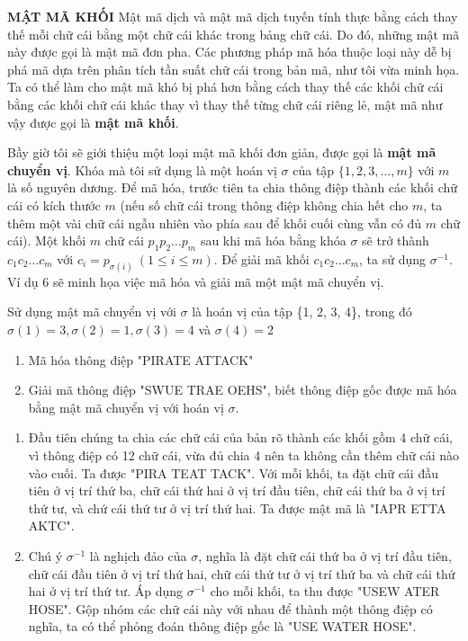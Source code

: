 \noindent \textcolor{Mycolor}{\textbf{MẬT MÃ KHỐI}} Mật mã dịch và mật mã dịch tuyến tính thực bằng cách thay thế mỗi chữ cái bằng một chữ cái khác trong bảng chữ cái. Do đó, những mật mã này được gọi là mật mã đơn pha. Các phương pháp mã hóa thuộc loại này dễ bị phá mã dựa trên phân tích tần suất chữ cái trong bản mã, như tôi vừa minh họa. Ta có thể làm cho mật mã khó bị phá hơn bằng cách thay thế các khối chữ cái bằng các khối chữ cái khác thay vì thay thế từng chữ cái riêng lẻ, mật mã như vậy được gọi là \textbf{mật mã khối}.

Bầy giờ tôi sẽ giới thiệu một loại mật mã khối đơn giản, được gọi là \textbf{mật mã chuyển vị}. Khóa mà tôi sử dụng là một hoán vị $\sigma$ của tập $\{1,2,3,\ldots,m\}$ với $m$ là số nguyên dương. Để mã hóa, trước tiên ta chia thông điệp thành các khối chữ cái có kích thước $m$ (nếu số chữ cái trong thông điệp không chia hết cho $m$, ta thêm một vài chữ cái ngẫu nhiên vào phía sau để khối cuối cùng vẫn có đủ $m$ chữ cái). Một khối $m$ chữ cái $p_1p_2\ldots p_m$ sau khi mã hóa bằng khóa $\sigma$ sẽ trở thành $c_1c_2\ldots c_m$ với $c_i = p_{\sigma(i)}\ ( 1\leq i \leq m)$. Để giải mã khối $c_1c_2\ldots c_m$, ta sử dụng $\sigma^{-1}$. Ví dụ 6 sẽ minh họa việc mã hóa và giải mã một mật mã chuyển vị.

\begin{example}
    Sử dụng mật mã chuyển vị với $\sigma$ là hoán vị của tập \{1, 2, 3, 4\}, trong đó $\sigma (1) = 3, \sigma (2) = 1, \sigma (3) = 4$ và $\sigma (4) = 2$
    \begin{enumerate}[label=\alph*)]
        \item Mã hóa thông điệp "PIRATE ATTACK"
        \item Giải mã thông điệp "SWUE TRAE OEHS", biết thông điệp gốc được mã hóa bằng mật mã chuyển vị với hoán vị $\sigma$.
    \end{enumerate}
\end{example}
\begin{solution}
    \begin{enumerate}[label=\alph*)]
        \item Đầu tiên chúng ta chia các chữ cái của bản rõ thành các khối gồm 4 chữ cái, vì thông điệp có 12 chữ cái, vừa đủ chia 4 nên ta không cần thêm chữ cái nào vào cuối.
              Ta được "PIRA TEAT TACK". Với mỗi khối, ta đặt chữ cái đầu tiên ở vị trí thứ ba, chữ cái thứ hai ở vị trí đầu tiên, chữ cái thứ ba ở vị trí thứ tư, và chứ cái thứ tư ở vị trí thứ hai.
              Ta được mật mã là "IAPR ETTA AKTC".

        \item Chú ý $\sigma^{-1}$ là nghịch đảo của $\sigma$, nghĩa là đặt chữ cái thứ ba ở vị trí đầu tiên, chữ cái đầu tiên ở vị trí thứ hai, chữ cái thứ tư ở vị trí thứ ba và chữ cái thứ hai ở vị trí thứ tư.
              Áp dụng $\sigma^{-1}$ cho mỗi khối, ta thu được "USEW ATER HOSE". Gộp nhóm các chữ cái này với nhau để thành một thông điệp có nghĩa, ta có thể phỏng đoán thông điệp gốc là "USE WATER HOSE".
    \end{enumerate}
\end{solution}

